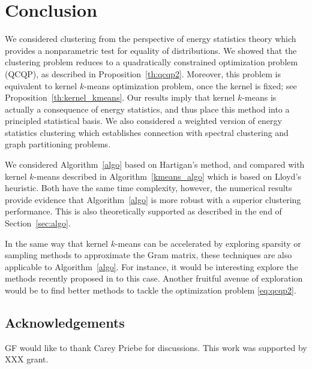 \documentclass[aps,preprint,nofootinbib,floatfix]{revtex4-1}
\begin{document}
\section{Conclusion}
\label{sec:conclusion}

We considered clustering from the perspective of energy
statistics theory which provides a nonparametric test for 
equality of distributions.
We showed that the clustering problem reduces to a quadratically
constrained optimization problem (QCQP), 
as described in Proposition~\ref{th:qcqp2}.
Moreover, this problem is equivalent
to kernel $k$-means optimization problem, once the kernel is fixed; see
Proposition~\ref{th:kernel_kmeans}. Our results imply that kernel $k$-means
is actually a consequence of energy statistics, and thus place this 
method into a principled statistical basis.
We also considered a weighted version of energy statistics clustering
which establishes connection with spectral
clustering and graph partitioning problems.

We considered Algorithm~\ref{algo} based on Hartigan's method, and
compared with 
kernel $k$-means described in Algorithm~\ref{kmeans_algo} which
is based on Lloyd's heuristic.
Both have the same time complexity, however, the numerical 
results provide evidence that Algorithm~\ref{algo} is more robust with
a superior clustering performance. This is also theoretically
supported as described in the end of Section~\ref{sec:algo}.

In the same way that kernel $k$-means can be accelerated by exploring
sparsity or sampling methods to approximate the Gram matrix, these
techniques are also applicable to Algorithm~\ref{algo}.
For instance, it would be interesting explore the methods recently proposed
in \cite{Mahoney} to this case. 
Another fruitful avenue of exploration would be to find 
better methods to tackle the optimization problem \eqref{eq:qcqp2}.


\bigskip

\subsection*{Acknowledgements}
GF would like to thank Carey Priebe for discussions.
This work was supported by XXX grant.




\end{document}
